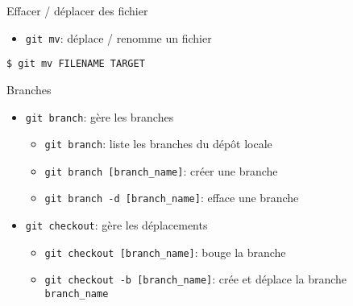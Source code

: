 \documentclass[unknownkeysallowed]{beamer}
\begin{document}
\begin{frame}[fragile]{Effacer / déplacer des fichier}



\begin{itemize}
  \item \lstinline[basicstyle =\ttfamily]+git mv+: déplace / renomme un fichier
\end{itemize}

\begin{lstlisting}
$ git mv FILENAME TARGET
\end{lstlisting}

\end{frame}


\begin{frame}{Branches}


\begin{itemize}
\item \lstinline[basicstyle =\ttfamily]+git branch+: gère les branches

\begin{itemize}
  \item
  \lstinline[basicstyle =\ttfamily]+git branch+: liste les branches du dépôt locale
  \item
  \lstinline[basicstyle =\ttfamily]+git branch [branch_name]+: créer une branche
  \item
  \lstinline[basicstyle =\ttfamily]+git branch -d [branch_name]+: efface une branche
\end{itemize}

\vspace{0.6cm}

\item \lstinline[basicstyle =\ttfamily]+git checkout+: gère les déplacements

\begin{itemize}
  \item \lstinline[basicstyle =\ttfamily]+git checkout [branch_name]+: bouge la branche
  \item \lstinline[basicstyle =\ttfamily]+git checkout -b [branch_name]+: crée et déplace la branche \lstinline[basicstyle =\ttfamily]+branch_name+
\end{itemize}
\end{itemize}

\end{frame}
\end{document}
